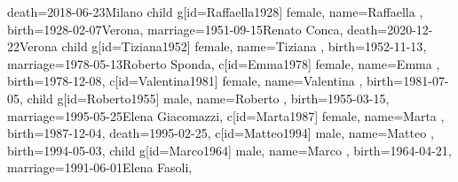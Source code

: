 \documentclass{article}
\begin{document}
\begin{midpage}
\begin{center}
\begin{genealogypicture}
{{{{{{{                            death={2018-06-23}{Milano}
                        }
                        child{
                            g[id=Raffaella1928]{
                                female,
                                name={Raffaella },
                                birth={1928-02-07}{Verona},
                                marriage={1951-09-15}{Renato Conca},
                                death={2020-12-22}{Verona}
                            }
                            child{
                                g[id=Tiziana1952]{
                                    female,
                                    name={Tiziana },
                                    birth={1952-11-13}{},
                                    marriage={1978-05-13}{Roberto Sponda},
                                }
                                c[id=Emma1978]{
                                    female,
                                    name={Emma },
                                    birth={1978-12-08}{},
                                }
                                c[id=Valentina1981]{
                                    female,
                                    name={Valentina },
                                    birth={1981-07-05}{},
                                }
                            }
                            child{
                                g[id=Roberto1955]{
                                    male,
                                    name={Roberto },
                                    birth={1955-03-15}{},
                                    marriage={1995-05-25}{Elena Giacomazzi},
                                }
                                c[id=Marta1987]{
                                    female,
                                    name={Marta },
                                    birth={1987-12-04}{},
                                    death={1995-02-25}{},
                                }
                                c[id=Matteo1994]{
                                    male,
                                    name={Matteo },
                                    birth={1994-05-03}{},
                                }
                            }
                            child{
                                g[id=Marco1964]{
                                    male,
                                    name={Marco },
                                    birth={1964-04-21}{},
                                    marriage={1991-06-01}{Elena Fasoli},
}}}}}}}}}
\end{genealogypicture}
\end{center}
\end{midpage}
\end{document}

